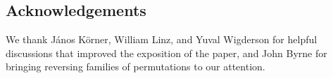 \documentclass[12pt]{article}
\begin{document}
\subsection*{Acknowledgements}

We thank J\'anos K\"orner, William Linz, and Yuval Wigderson for helpful discussions that improved the exposition of the paper, and John Byrne for bringing reversing families of permutations to our attention.






\end{document}
